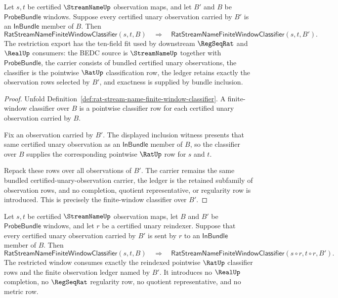 \begin{theorem}
\label{thm:streamname-finite-window-restriction-export}
Let $s,t$ be certified $\StreamNameUp$ observation maps, and let $B'$ and $B$
be $\mathsf{ProbeBundle}$ windows. Suppose every certified unary observation
carried by $B'$ is an $\mathsf{InBundle}$ member of $B$. Then
$$
\mathsf{RatStreamNameFiniteWindowClassifier}(s,t,B)
\quad\Longrightarrow\quad
\mathsf{RatStreamNameFiniteWindowClassifier}(s,t,B').
$$
The restriction export has the ten-field fit used by downstream
$\RegSeqRat$ and $\RealUp$ consumers: the BEDC source is
$\StreamNameUp$ together with $\mathsf{ProbeBundle}$, the carrier consists of
bundled certified unary observations, the classifier is the pointwise
$\RatUp$ classification row, the ledger retains exactly the observation rows
selected by $B'$, and exactness is supplied by bundle inclusion.
\end{theorem}

\begin{proof}
Unfold Definition~\ref{def:rat-stream-name-finite-window-classifier}.  A
finite-window classifier over $B$ is a pointwise classifier row for each
certified unary observation carried by $B$.

Fix an observation carried by $B'$.  The displayed inclusion witness presents
that same certified unary observation as an $\mathsf{InBundle}$ member of
$B$, so the classifier over $B$ supplies the corresponding pointwise
$\RatUp$ row for $s$ and $t$.

Repack these rows over all observations of $B'$.  The carrier remains the
same bundled certified-unary-observation carrier, the ledger is the retained
subfamily of observation rows, and no completion, quotient representative, or
regularity row is introduced.  This is precisely the finite-window classifier
over $B'$.
\end{proof}

\begin{theorem}
\label{thm:streamname-finite-window-reindexing-stability}
Let $s,t$ be certified $\StreamNameUp$ observation maps, let $B$ and $B'$ be
$\mathsf{ProbeBundle}$ windows, and let $r$ be a certified unary reindexer.
Suppose that every certified unary observation carried by $B'$ is sent by $r$
to an $\mathsf{InBundle}$ member of $B$. Then
$$
\mathsf{RatStreamNameFiniteWindowClassifier}(s,t,B)
\quad\Longrightarrow\quad
\mathsf{RatStreamNameFiniteWindowClassifier}(s\circ r,t\circ r,B').
$$
The restricted window consumes exactly the reindexed pointwise $\RatUp$
classifier rows and the finite observation ledger named by $B'$. It introduces
no $\RealUp$ completion, no $\RegSeqRat$ regularity row, no quotient
representative, and no metric row.
\end{theorem}

